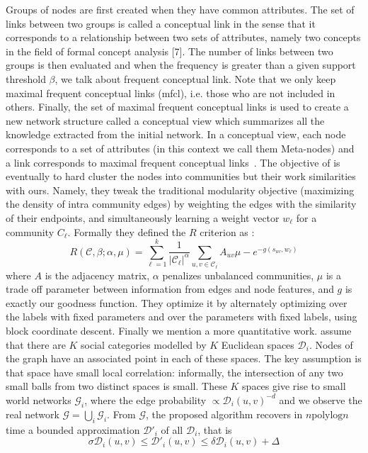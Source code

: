 Groups of nodes are first created when they have common attributes. The set of links between two
groups is called a conceptual link in the sense that it corresponds to a relationship between two
sets of attributes, namely two concepts in the field of formal concept analysis [7]. The number of
links between two groups is then evaluated and when the frequency is greater than a given support
threshold $\beta$, we talk about frequent conceptual link. Note that we only keep maximal frequent
conceptual links (mfcl), i.e. those who are not included in others.  Finally, the set of maximal
frequent conceptual links is used to create a new network structure called a conceptual view which
summarizes all the knowledge extracted from the initial network. In a conceptual view, each node
corresponds to a set of attributes (in this context we call them Meta-nodes) and a link corresponds
to maximal frequent conceptual links~\autocite{conceptualLinks12}.
The objective of \textcite{ZhangModelFree16} is eventually to hard cluster the nodes into
communities but their work similarities with ours. Namely, they tweak the traditional modularity
objective (maximizing the density of intra community edges) by weighting the edges with the
similarity of their endpoints, and simultaneously learning a weight vector $w_\ell$ for a community
$C_\ell$. Formally they defined the $R$ criterion as :
\begin{equation*}
  R(\mathcal{C}, \beta;\alpha, \mu) = \sum_{\ell=1}^k \frac{1}{|\mathcal{C}_\ell|^\alpha}
  \sum_{u,v \in \mathcal{C}_\ell} A_{uv} \mu -e^{-g(s_{uv}, w_\ell)}
\end{equation*}
where $A$ is the adjacency matrix, $\alpha$ penalizes unbalanced communities, $\mu$ is a trade off
parameter between information from edges and node features, and $g$ is exactly our goodness
function.  They optimize it by alternately optimizing over the labels with fixed parameters and over
the parameters with fixed labels, using block coordinate descent.
Finally we mention a more quantitative work. \Textcite{Abraham2012a} assume that there are $K$
social categories modelled by $K$ Euclidean spaces $\mathcal{D}_i$. Nodes of the graph have an
associated point in each of these spaces. The key assumption is that space have small local
correlation: informally, the intersection of any two small balls from two distinct spaces is small.
These $K$ spaces give rise to small world networks $\mathcal{G}_i$, where the edge probability
$\propto \mathcal{D}_i(u, v)^{-d}$ and we observe the real network $\mathcal{G} =\bigcup_i
\mathcal{G}_i$. From $\mathcal{G}$, the proposed algorithm recovers in $n \mathrm{polylog} n$ time a
bounded approximation $\mathcal{D}'_i$ of all $\mathcal{D}_i$, that is
\begin{equation*}
  \sigma \mathcal{D}_i(u, v) \leq \mathcal{D}'_i(u, v) \leq \delta \mathcal{D}_i(u, v) + \Delta
\end{equation*}

